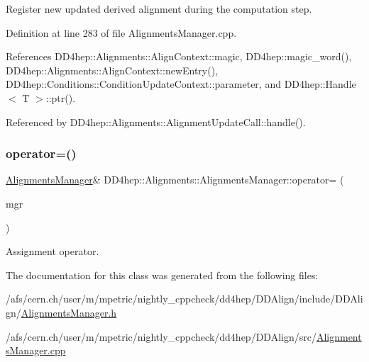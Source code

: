 Register new updated derived alignment during the computation step. 



Definition at line 283 of file Alignments\+Manager.\+cpp.



References D\+D4hep\+::\+Alignments\+::\+Align\+Context\+::magic, D\+D4hep\+::magic\+\_\+word(), D\+D4hep\+::\+Alignments\+::\+Align\+Context\+::new\+Entry(), D\+D4hep\+::\+Conditions\+::\+Condition\+Update\+Context\+::parameter, and D\+D4hep\+::\+Handle$<$ T $>$\+::ptr().



Referenced by D\+D4hep\+::\+Alignments\+::\+Alignment\+Update\+Call\+::handle().

\hypertarget{class_d_d4hep_1_1_alignments_1_1_alignments_manager_a6ec14b52aad01497dabaebbf76aa0a43}{}\label{class_d_d4hep_1_1_alignments_1_1_alignments_manager_a6ec14b52aad01497dabaebbf76aa0a43} 
\subsubsection{\texorpdfstring{operator=()}{operator=()}}
{\footnotesize\ttfamily \hyperlink{class_d_d4hep_1_1_alignments_1_1_alignments_manager}{Alignments\+Manager}\& D\+D4hep\+::\+Alignments\+::\+Alignments\+Manager\+::operator= (\begin{DoxyParamCaption}\item[{const \hyperlink{class_d_d4hep_1_1_alignments_1_1_alignments_manager}{Alignments\+Manager} \&}]{mgr }\end{DoxyParamCaption})\hspace{0.3cm}{\ttfamily [default]}}



Assignment operator. 



The documentation for this class was generated from the following files\+:\begin{DoxyCompactItemize}
\item 
/afs/cern.\+ch/user/m/mpetric/nightly\+\_\+cppcheck/dd4hep/\+D\+D\+Align/include/\+D\+D\+Align/\hyperlink{_alignments_manager_8h}{Alignments\+Manager.\+h}\item 
/afs/cern.\+ch/user/m/mpetric/nightly\+\_\+cppcheck/dd4hep/\+D\+D\+Align/src/\hyperlink{_alignments_manager_8cpp}{Alignments\+Manager.\+cpp}\end{DoxyCompactItemize}
